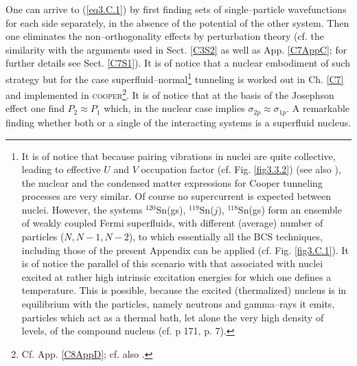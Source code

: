 One can arrive to  (\ref{eq3.C.1}) by first finding sets of single--particle wavefunctions for each side separately, in the absence of the potential of the other system. Then one eliminates the non--orthogonality effects by perturbation theory (cf. the similarity with the arguments used in Sect. \ref{C3S2} as well as App. \ref{C7AppC}; for further details see Sect. \ref{C7S1}). It is of notice that a nuclear embodiment of such strategy but for the case superfluid--normal\footnote{It is of notice that because  pairing vibrations in nuclei are quite collective, leading to effective $U$ and $V$ occupation factor (cf. Fig. \ref{fig3.3.2}) (see also \cite{Potel:13b}), the nuclear and the condensed matter expressions for Cooper tunneling processes are very similar. Of course no supercurrent is expected between nuclei. However, the systems $^{120}$Sn(gs), $^{119}$Sn($j$), $^{118}$Sn(gs) form an ensemble of weakly coupled Fermi superfluids, with different (average) number of particles ($N,N-1,N-2$), to which essentially all the BCS techniques, including those of the present Appendix can be applied (cf. Fig. \ref{fig3.C.1}). It is of notice the parallel of this scenario with that associated with nuclei excited at rather high intrinsic excitation energies for which one defines a temperature. This is possible, because the excited (thermalized) nucleus is in equilibrium with the particles, namely neutrons and gamma--rays it emits, particles which act as a thermal bath, let alone the very high density of levels, of the compound nucleus (cf. \cite{Bertsch:05} p 171, \cite{Bortignon:98} p. 7).} tunneling is worked out in Ch. \ref{C7} and implemented in \textsc{cooper}\footnote{Cf. App. \ref{C8AppD}; cf. also \cite{Broglia:04a}.}. It is of notice that at the basis of the Josephson effect one find $P_2\approx P_1$ which, in the nuclear case implies $\sigma_{2p}\approx\sigma_{1p}$. A remarkable finding whether both or a single of the interacting systems is a superfluid nucleus. 


